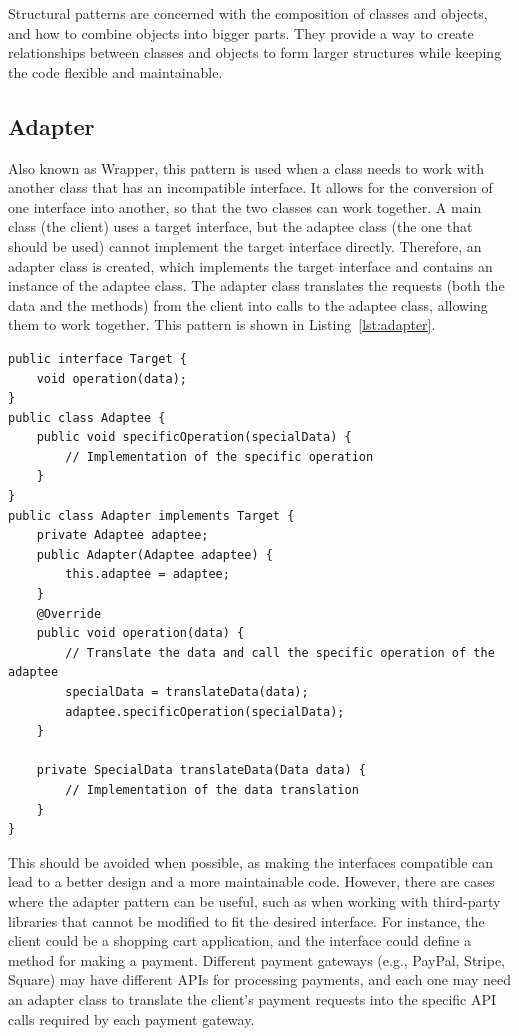 Structural patterns are concerned with the composition of classes and objects, and how to combine objects into bigger parts. They provide a way to create relationships between classes and objects to form larger structures while keeping the code flexible and maintainable.

\subsection{Adapter}

Also known as Wrapper, this pattern is used when a class needs to work with another class that has an incompatible interface. It allows for the conversion of one interface into another, so that the two classes can work together. A main class (the client) uses a target interface, but the adaptee class (the one that should be used) cannot implement the target interface directly. Therefore, an adapter class is created, which implements the target interface and contains an instance of the adaptee class. The adapter class translates the requests (both the data and the methods) from the client into calls to the adaptee class, allowing them to work together. This pattern is shown in Listing~\ref{lst:adapter}.
\begin{listing}
    \begin{verbatim}
public interface Target {
    void operation(data);
}
public class Adaptee {
    public void specificOperation(specialData) {
        // Implementation of the specific operation
    }
}
public class Adapter implements Target {
    private Adaptee adaptee;
    public Adapter(Adaptee adaptee) {
        this.adaptee = adaptee;
    }
    @Override
    public void operation(data) {
        // Translate the data and call the specific operation of the adaptee
        specialData = translateData(data);
        adaptee.specificOperation(specialData);
    }

    private SpecialData translateData(Data data) {
        // Implementation of the data translation
    }
}
    \end{verbatim}
    \caption{Example of the Adapter pattern.}
    \label{lst:adapter}
\end{listing}

This should be avoided when possible, as making the interfaces compatible can lead to a better design and a more maintainable code. However, there are cases where the adapter pattern can be useful, such as when working with third-party libraries that cannot be modified to fit the desired interface. For instance, the client could be a shopping cart application, and the interface could define a method for making a payment. Different payment gateways (e.g., PayPal, Stripe, Square) may have different APIs for processing payments, and each one may need an adapter class to translate the client's payment requests into the specific API calls required by each payment gateway.


